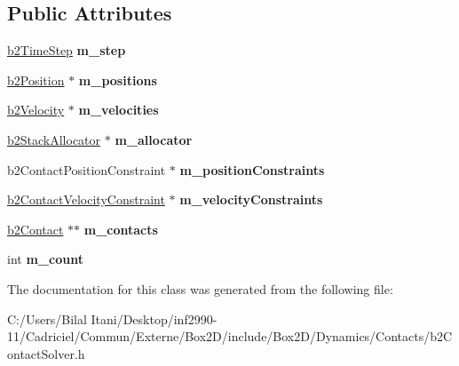 \subsection*{Public Attributes}
\begin{DoxyCompactItemize}
\item 
\hyperlink{structb2_time_step}{b2\+Time\+Step} {\bfseries m\+\_\+step}\hypertarget{classb2_contact_solver_aac78600ba5fd3249bac20678cbc9f101}{}\label{classb2_contact_solver_aac78600ba5fd3249bac20678cbc9f101}

\item 
\hyperlink{structb2_position}{b2\+Position} $\ast$ {\bfseries m\+\_\+positions}\hypertarget{classb2_contact_solver_a39b973c8311e522f44cda9053dcea5a8}{}\label{classb2_contact_solver_a39b973c8311e522f44cda9053dcea5a8}

\item 
\hyperlink{structb2_velocity}{b2\+Velocity} $\ast$ {\bfseries m\+\_\+velocities}\hypertarget{classb2_contact_solver_aae6dae9341dbbd780e7b3ec6b1b332f9}{}\label{classb2_contact_solver_aae6dae9341dbbd780e7b3ec6b1b332f9}

\item 
\hyperlink{classb2_stack_allocator}{b2\+Stack\+Allocator} $\ast$ {\bfseries m\+\_\+allocator}\hypertarget{classb2_contact_solver_a6a2c9f5470a469e50d7f33f8d9095abe}{}\label{classb2_contact_solver_a6a2c9f5470a469e50d7f33f8d9095abe}

\item 
b2\+Contact\+Position\+Constraint $\ast$ {\bfseries m\+\_\+position\+Constraints}\hypertarget{classb2_contact_solver_ac0f4106f7cf67d185a7a4f3fd5a4e4ce}{}\label{classb2_contact_solver_ac0f4106f7cf67d185a7a4f3fd5a4e4ce}

\item 
\hyperlink{structb2_contact_velocity_constraint}{b2\+Contact\+Velocity\+Constraint} $\ast$ {\bfseries m\+\_\+velocity\+Constraints}\hypertarget{classb2_contact_solver_a616319ffa7ceb509b8189f07a070f7c7}{}\label{classb2_contact_solver_a616319ffa7ceb509b8189f07a070f7c7}

\item 
\hyperlink{classb2_contact}{b2\+Contact} $\ast$$\ast$ {\bfseries m\+\_\+contacts}\hypertarget{classb2_contact_solver_aa1c7370d1d2681f9d49a494f9b0a38c6}{}\label{classb2_contact_solver_aa1c7370d1d2681f9d49a494f9b0a38c6}

\item 
int {\bfseries m\+\_\+count}\hypertarget{classb2_contact_solver_ab5b74c0fadf0d5d8997700b5ff91ea91}{}\label{classb2_contact_solver_ab5b74c0fadf0d5d8997700b5ff91ea91}

\end{DoxyCompactItemize}


The documentation for this class was generated from the following file\+:\begin{DoxyCompactItemize}
\item 
C\+:/\+Users/\+Bilal Itani/\+Desktop/inf2990-\/11/\+Cadriciel/\+Commun/\+Externe/\+Box2\+D/include/\+Box2\+D/\+Dynamics/\+Contacts/b2\+Contact\+Solver.\+h\end{DoxyCompactItemize}
